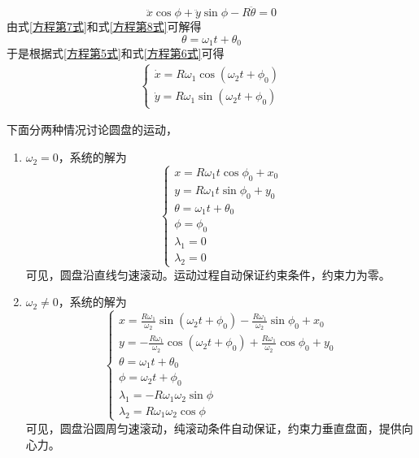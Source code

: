 \begin{solution}
\begin{equation}
	\ddot{x} \cos \phi+\ddot{y}\sin \phi - R\ddot{\theta} = 0
	\label{方程第8式}
\end{equation}
由式\eqref{方程第7式}和式\eqref{方程第8式}可解得
\begin{equation*}
	\theta = \omega_1 t + \theta_0
\end{equation*}
于是根据式\eqref{方程第5式}和式\eqref{方程第6式}可得
\begin{align*}
	\begin{cases}
		\dot{x} = R\omega_1 \cos(\omega_2 t + \phi_0) \\
		\dot{y} = R\omega_1 \sin(\omega_2 t + \phi_0)
	\end{cases}
\end{align*}

下面分两种情况讨论圆盘的运动，
\begin{enumerate}
	\item $\omega_2 = 0$，系统的解为
	\begin{equation}
	\begin{cases}
		x = R\omega_1 t \cos \phi_0 + x_0 \\
		y = R\omega_1 t \sin \phi_0 + y_0 \\
		\theta = \omega_1 t + \theta_0 \\
		\phi = \phi_0 \\
		\lambda_1 = 0 \\
		\lambda_2 = 0
	\end{cases}
	\end{equation}
	可见，圆盘沿直线匀速滚动。运动过程自动保证约束条件，约束力为零。
	\item $\omega_2 \neq 0$，系统的解为
	\begin{equation}
	\begin{cases}
		\displaystyle x = \frac{R\omega_1}{\omega_2} \sin(\omega_2 t + \phi_0) - \frac{R\omega_1}{\omega_2} \sin \phi_0 + x_0 \\
		\displaystyle y = -\frac{R\omega_1}{\omega_2} \cos(\omega_2 t + \phi_0) + \frac{R\omega_1}{\omega_2} \cos \phi_0 + y_0 \\
		\theta = \omega_1 t + \theta_0 \\
		\phi = \omega_2 t + \phi_0 \\
		\lambda_1 = -R\omega_1 \omega_2 \sin \phi \\
		\lambda_2 = R\omega_1 \omega_2 \cos \phi
	\end{cases}
	\end{equation}	
	可见，圆盘沿圆周匀速滚动，纯滚动条件自动保证，约束力垂直盘面，提供向心力。
\end{enumerate}
\end{solution}

